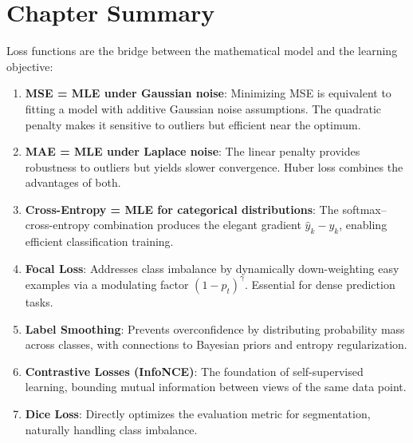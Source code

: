 \section{Chapter Summary}

Loss functions are the bridge between the mathematical model and the learning objective:

\begin{enumerate}
    \item \textbf{MSE = MLE under Gaussian noise}: Minimizing MSE is equivalent to fitting a model with additive Gaussian noise assumptions. The quadratic penalty makes it sensitive to outliers but efficient near the optimum.

    \item \textbf{MAE = MLE under Laplace noise}: The linear penalty provides robustness to outliers but yields slower convergence. Huber loss combines the advantages of both.

    \item \textbf{Cross-Entropy = MLE for categorical distributions}: The softmax--cross-entropy combination produces the elegant gradient $\hat{y}_k - y_k$, enabling efficient classification training.

    \item \textbf{Focal Loss}: Addresses class imbalance by dynamically down-weighting easy examples via a modulating factor $(1 - p_t)^\gamma$. Essential for dense prediction tasks.

    \item \textbf{Label Smoothing}: Prevents overconfidence by distributing probability mass across classes, with connections to Bayesian priors and entropy regularization.

    \item \textbf{Contrastive Losses (InfoNCE)}: The foundation of self-supervised learning, bounding mutual information between views of the same data point.

    \item \textbf{Dice Loss}: Directly optimizes the evaluation metric for segmentation, naturally handling class imbalance.
\end{enumerate}

